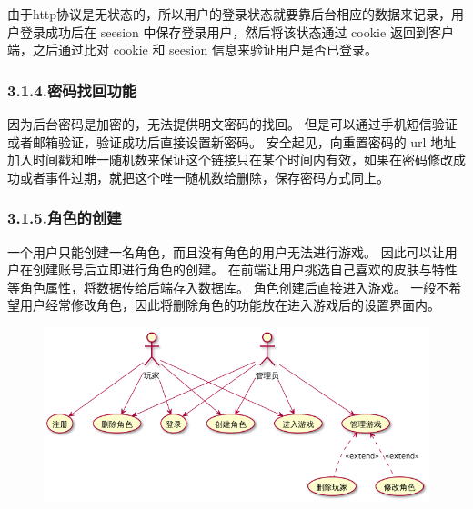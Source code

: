 \documentclass{article}
\begin{document}
\noindent{}由于http协议是无状态的，所以用户的登录状态就要靠后台相应的数据来记录，用户登录成功后在 seesion 中保存登录用户，然后将该状态通过 cookie 返回到客户端，之后通过比对 cookie 和 seesion 信息来验证用户是否已登录。%

\subsubsection{3.1.4.\hspace*{0.5em}密码找回功能}\label{314}%

\noindent{}因为后台密码是加密的，无法提供明文密码的找回。 但是可以通过手机短信验证或者邮箱验证，验证成功后直接设置新密码。 安全起见，向重置密码的 url 地址加入时间戳和唯一随机数来保证这个链接只在某个时间内有效，如果在密码修改成功或者事件过期，就把这个唯一随机数给删除，保存密码方式同上。%

\subsubsection{3.1.5.\hspace*{0.5em}角色的创建}\label{315}%

\noindent{}一个用户只能创建一名角色，而且没有角色的用户无法进行游戏。 因此可以让用户在创建账号后立即进行角色的创建。 在前端让用户挑选自己喜欢的皮肤与特性等角色属性，将数据传给后端存入数据库。 角色创建后直接进入游戏。 一般不希望用户经常修改角色，因此将删除角色的功能放在进入游戏后的设置界面内。%

\begin{figure}[tbp]%
\begin{mdcenter}%

\noindent{}\includegraphics[keepaspectratio=true,width=\dimwidth{1.00}]{./img/1}{}%

\mdhr{}%

\noindent{}%
\end{mdcenter}%
\end{figure}%
\end{document}
